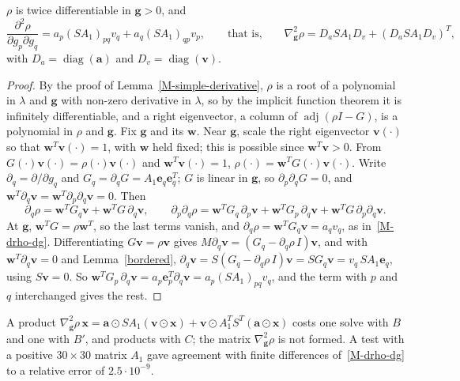 \begin{lemma}\label{hessian-g}
$\rho$ is twice differentiable in $\bm g>0$, and
\begin{equation*}
\frac{\partial^2\rho}{\partial g_p\partial g_q}=a_p\left(SA_1\right)_{pq}v_q+a_q\left(SA_1\right)_{qp}v_p,
\qquad\mbox{that is,}\qquad
\nabla^2_{\bm g}\rho=D_aSA_1D_v+\left(D_aSA_1D_v\right)^T,
\end{equation*}
with $D_a=\operatorname{diag}(\bm a)$ and $D_v=\operatorname{diag}(\bm v)$.
\end{lemma}
\begin{proof}
By the proof of Lemma~\ref{M-simple-derivative}, $\rho$ is a root of a
polynomial in $\lambda$ and $\bm g$ with non-zero derivative in $\lambda$, so
by the implicit function theorem it is infinitely differentiable, and a right
eigenvector, a column of $\operatorname{adj}(\rho I-G)$, is a polynomial in
$\rho$ and $\bm g$. Fix $\bm g$ and its $\bm w$. Near $\bm g$, scale the right
eigenvector $\bm v(\cdot)$ so that $\bm w^T\bm v(\cdot)=1$, with $\bm w$ held
fixed; this is possible since $\bm w^T\bm v>0$. From
$G(\cdot)\bm v(\cdot)=\rho(\cdot)\bm v(\cdot)$ and $\bm w^T\bm v(\cdot)=1$,
$\rho(\cdot)=\bm w^TG(\cdot)\bm v(\cdot)$. Write $\partial_q=\partial/\partial g_q$
and $G_q=\partial_qG=A_1\bm e_q\bm e_q^T$; $G$ is linear in $\bm g$, so
$\partial_p\partial_qG=0$, and $\bm w^T\partial_q\bm v=\bm w^T\partial_p\partial_q\bm v=0$.
Then
\begin{equation*}
\partial_q\rho=\bm w^TG_q\bm v+\bm w^TG\,\partial_q\bm v,\qquad
\partial_p\partial_q\rho=\bm w^TG_q\,\partial_p\bm v+\bm w^TG_p\,\partial_q\bm v+\bm w^TG\,\partial_p\partial_q\bm v .
\end{equation*}
At $\bm g$, $\bm w^TG=\rho\bm w^T$, so the last terms vanish, and
$\partial_q\rho=\bm w^TG_q\bm v=a_qv_q$, as in~\eqref{M-drho-dg}. Differentiating
$G\bm v=\rho\bm v$ gives $M\partial_q\bm v=(G_q-\partial_q\rho\, I)\bm v$, and with
$\bm w^T\partial_q\bm v=0$ and Lemma~\ref{bordered},
$\partial_q\bm v=S(G_q-\partial_q\rho\,I)\bm v=SG_q\bm v=v_q\,SA_1\bm e_q$, using $S\bm v=0$.
So $\bm w^TG_p\,\partial_q\bm v=a_p\bm e_p^T\partial_q\bm v=a_p\left(SA_1\right)_{pq}v_q$,
and the term with $p$ and $q$ interchanged gives the rest.
\end{proof}

A product $\nabla^2_{\bm g}\rho\,\bm x=\bm a\odot SA_1(\bm v\odot\bm x)+\bm v\odot A_1^TS^T(\bm a\odot\bm x)$
costs one solve with $B$ and one with $B'$, and products with $C$; the matrix
$\nabla^2_{\bm g}\rho$ is not formed. A test with a positive $30\times30$ matrix
$A_1$ gave agreement with finite differences of~\eqref{M-drho-dg} to a relative
error of $2.5\cdot10^{-9}$.

